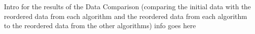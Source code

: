 \documentclass[../../ClusteringConnectionsMAIN.tex]{subfiles}
\begin{document}
\begin{flushleft}
\begin{large}

Intro for the results of the Data Comparison (comparing the initial data with the reordered data from each algorithm and the reordered data from each algorithm to the reordered data from the other algorithms) info goes here


\end{large}
\end{flushleft}
\end{document}
